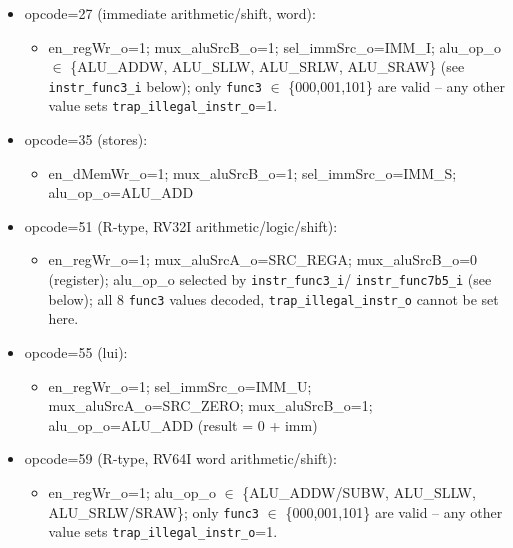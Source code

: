 \begin{itemize}
\begin{itemize}
\begin{itemize}
      \begin{itemize}
        \item en\_regWr\_o=1; sel\_immSrc\_o=IMM\_U; mux\_aluSrcA\_o=SRC\_PC;
          mux\_aluSrcB\_o=1; alu\_op\_o=ALU\_ADD
      \end{itemize}
      \item opcode=27 (immediate arithmetic/shift, word):
      \begin{itemize}
        \item en\_regWr\_o=1; mux\_aluSrcB\_o=1; sel\_immSrc\_o=IMM\_I;
          alu\_op\_o $\in$ \{ALU\_ADDW, ALU\_SLLW, ALU\_SRLW, ALU\_SRAW\}
          (see \texttt{instr\_func3\_i} below); only \texttt{func3}
          $\in$ \{000,001,101\} are valid -- any other value sets
          \texttt{trap\_illegal\_instr\_o}=1.
      \end{itemize}
      \item opcode=35 (stores):
      \begin{itemize}
        \item en\_dMemWr\_o=1; mux\_aluSrcB\_o=1; sel\_immSrc\_o=IMM\_S;
          alu\_op\_o=ALU\_ADD
      \end{itemize}
      \item opcode=51 (R-type, RV32I arithmetic/logic/shift):
      \begin{itemize}
        \item en\_regWr\_o=1; mux\_aluSrcA\_o=SRC\_REGA; mux\_aluSrcB\_o=0
          (register); alu\_op\_o selected by \texttt{instr\_func3\_i}/
          \texttt{instr\_func7b5\_i} (see below); all 8 \texttt{func3}
          values decoded, \texttt{trap\_illegal\_instr\_o} cannot be set here.
      \end{itemize}
      \item opcode=55 (lui):
      \begin{itemize}
        \item en\_regWr\_o=1; sel\_immSrc\_o=IMM\_U; mux\_aluSrcA\_o=SRC\_ZERO;
          mux\_aluSrcB\_o=1; alu\_op\_o=ALU\_ADD (result = 0 + imm)
      \end{itemize}
      \item opcode=59 (R-type, RV64I word arithmetic/shift):
      \begin{itemize}
        \item en\_regWr\_o=1; alu\_op\_o $\in$ \{ALU\_ADDW/SUBW, ALU\_SLLW,
          ALU\_SRLW/SRAW\}; only \texttt{func3} $\in$ \{000,001,101\} are
          valid -- any other value sets \texttt{trap\_illegal\_instr\_o}=1.
      \end{itemize}

\end{itemize}
\end{itemize}
\end{itemize}

